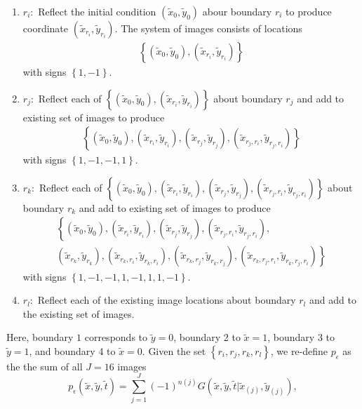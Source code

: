 \begin{enumerate}
\item $r_i:$ Reflect the initial condition
  $(\tilde{x}_0, \tilde{y}_0)$ abour boundary $r_i$ to produce
  coordinate $(\tilde{x}_{r_i}, \tilde{y}_{r_i})$. The system of
  images consists of locations
  \begin{align*}
    \left\{(\tilde{x}_0, \tilde{y}_0), (\tilde{x}_{r_i},
  \tilde{y}_{r_i})\right\}
  \end{align*}
  with signs $\left\{1, -1\right\}$.
\item $r_j:$ Reflect each of $\left\{(\tilde{x}_0, \tilde{y}_0), (\tilde{x}_{r_i},
  \tilde{y}_{r_i})\right\}$ about boundary $r_j$ and add to existing set of images to produce 
  \begin{align*}
    \left\{ (\tilde{x}_0, \tilde{y}_0), (\tilde{x}_{r_i},
    \tilde{y}_{r_i}), (\tilde{x}_{r_j}, \tilde{y}_{r_j}), (\tilde{x}_{r_j, r_i},
    \tilde{y}_{r_j, r_i}) \right\}
  \end{align*}
  with signs $\left\{1,-1,-1,1\right\}$.
  
\item $r_k:$ Reflect each of $\left\{ (\tilde{x}_0, \tilde{y}_0), (\tilde{x}_{r_i},
    \tilde{y}_{r_i}), (\tilde{x}_{r_j}, \tilde{y}_{r_j}), (\tilde{x}_{r_j, r_i},
    \tilde{y}_{r_j, r_i}) \right\}$ about boundary $r_k$ and add to existing set of images to produce 
  \begin{align*}
    & \left\{ (\tilde{x}_0, \tilde{y}_0), (\tilde{x}_{r_i},
    \tilde{y}_{r_i}), (\tilde{x}_{r_j}, \tilde{y}_{r_j}), (\tilde{x}_{r_j, r_i},
    \tilde{y}_{r_j, r_i}), \right. & \\
    & \left. (\tilde{x}_{r_k}, \tilde{y}_{r_k}), (\tilde{x}_{r_k, r_i},
    \tilde{y}_{r_k, r_i}), (\tilde{x}_{r_k, r_j}, \tilde{y}_{r_k, r_j}), (\tilde{x}_{r_k, r_j, r_i},
    \tilde{y}_{r_k, r_j, r_i})  \right\}&
  \end{align*}
  with signs $\left\{1,-1,-1,1, -1,1,1,-1\right\}$.
\item $r_l:$ Reflect each of the existing image locations about
  boundary $r_l$ and add to the existing set of images.
\end{enumerate}
Here, boundary $1$ corresponds to $\tilde{y}=0$, boundary 2 to
$\tilde{x}=1$, boundary 3 to $\tilde{y}=1$, and boundary 4 to
$\tilde{x} = 0$.  Given the set $\left\{r_i,r_j,r_k,r_l\right\}$, we
re-define $p_\epsilon$ as the the sum of all $J = 16$ images
\begin{equation*}
  p_\epsilon(\tilde{x}, \tilde{y}, \tilde{t}) = \sum_{j=1}^J (-1)^{n(j)}
  G(\tilde{x},\tilde{y},\tilde{t}|\tilde{x}_{(j)},\tilde{y}_{(j)}), 
\end{equation*}
